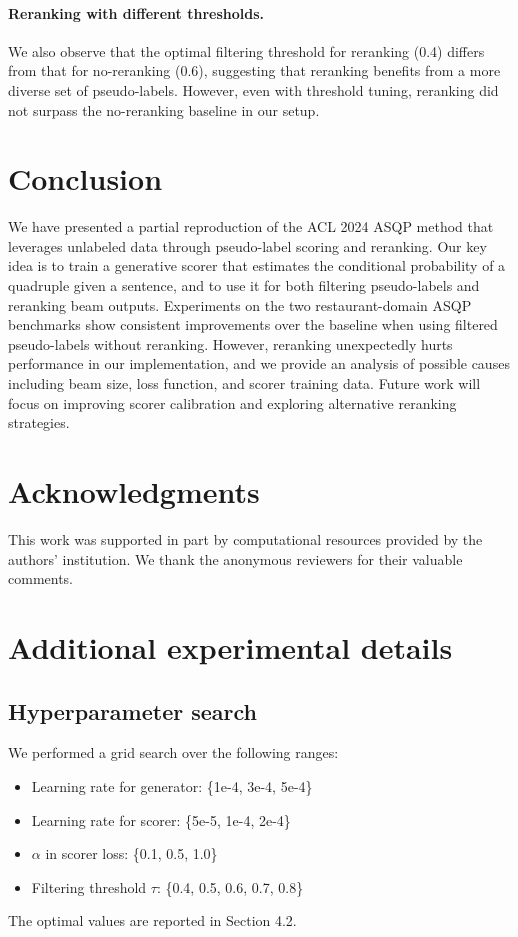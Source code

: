 \documentclass{article}
\begin{document}
\paragraph{Reranking with different thresholds.}
We also observe that the optimal filtering threshold for reranking (0.4) differs from that for no-reranking (0.6), suggesting that reranking benefits from a more diverse set of pseudo-labels. However, even with threshold tuning, reranking did not surpass the no-reranking baseline in our setup.

\section{Conclusion}

We have presented a partial reproduction of the ACL 2024 ASQP method \citep{zhang-etal-2024-self-training} that leverages unlabeled data through pseudo-label scoring and reranking. Our key idea is to train a generative scorer that estimates the conditional probability of a quadruple given a sentence, and to use it for both filtering pseudo-labels and reranking beam outputs. Experiments on the two restaurant-domain ASQP benchmarks show consistent improvements over the baseline when using filtered pseudo-labels without reranking. However, reranking unexpectedly hurts performance in our implementation, and we provide an analysis of possible causes including beam size, loss function, and scorer training data. Future work will focus on improving scorer calibration and exploring alternative reranking strategies.

\section*{Acknowledgments}

This work was supported in part by computational resources provided by the authors' institution. We thank the anonymous reviewers for their valuable comments.




\appendix
\section{Additional experimental details}

\subsection{Hyperparameter search}
We performed a grid search over the following ranges:
\begin{itemize}
    \item Learning rate for generator: \{1e-4, 3e-4, 5e-4\}
    \item Learning rate for scorer: \{5e-5, 1e-4, 2e-4\}
    \item \(\alpha\) in scorer loss: \{0.1, 0.5, 1.0\}
    \item Filtering threshold \(\tau\): \{0.4, 0.5, 0.6, 0.7, 0.8\}
\end{itemize}
The optimal values are reported in Section 4.2.
\end{document}
